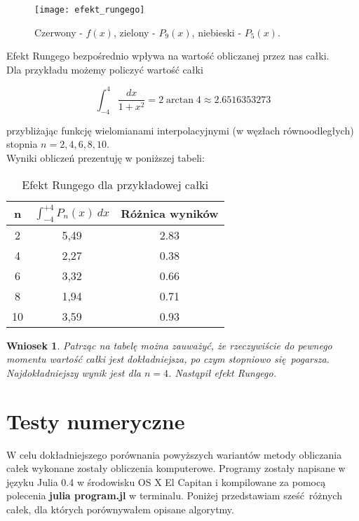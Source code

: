 \documentclass{article}
\newtheorem{wniosek}{Wniosek}
\begin{document}
\begin{figure}[h!]
\centering
\texttt{[image: efekt\_rungego]}
\caption{Czerwony - $f(x)$, zielony - $P_9(x)$, niebieski - $P_5(x)$.}       
\end{figure}

Efekt Rungego bezpośrednio wpływa na wartość obliczanej przez nas całki.\\
Dla przykładu możemy policzyć wartość całki 

$$
\int_{-4}^{4} \frac{dx}{1 + x^2} = 2 \arctan{4} \approx 2.6516353273
$$

przybliżając funkcję wielomianami interpolacyjnymi (w węzłach równoodległych) stopnia $n = 2, 4, 6, 8, 10$.\\
Wyniki obliczeń prezentuję w poniższej tabeli:


\begin{table}[h!]
\centering
\caption{Efekt Rungego dla przykładowej całki}
\label{my-label}
\begin{tabular}{|c|c|c|}
\hline
n  & $\int_{-4}^{+4} P_n(x) \ dx$ & Różnica wyników \\ \hline
2  & 5,49 & 2.83               \\ \hline
4  & 2,27 & 0.38               \\ \hline
6  & 3,32 & 0.66               \\ \hline
8  & 1,94 & 0.71               \\ \hline
10 & 3,59 & 0.93              \\ \hline
\end{tabular}
\end{table}

\begin{wniosek}
Patrząc na tabelę można zauważyć, że rzeczywiście do pewnego momentu wartość całki jest dokładniejsza, po czym stopniowo się pogarsza. Najdokładniejszy wynik jest dla $n = 4$. Nastąpił efekt Rungego. 
\end{wniosek}



\pagebreak

\section{Testy numeryczne}

W celu dokładniejszego porównania powyższych wariantów metody obliczania całek wykonane zostały obliczenia komputerowe. Programy zostały napisane w języku Julia 0.4 w środowisku OS X El Capitan i kompilowane za pomocą polecenia \textbf{julia program.jl} w terminalu. Poniżej przedstawiam sześć różnych całek, dla których porównywałem opisane algorytmy.
\end{document}
